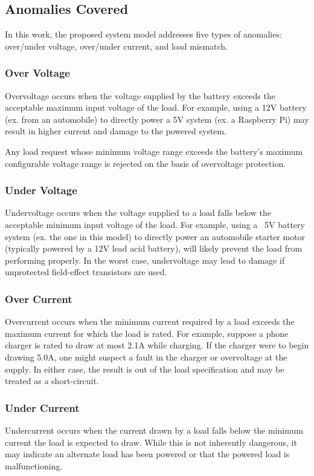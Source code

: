 \documentclass[11pt,conference,draftcls,onecolumn]{IEEEtran}
\begin{document}
\subsection{Anomalies Covered}
In this work, the proposed system model addresses five types of anomalies: over/under voltage, over/under current, and load mismatch.

\subsubsection{Over Voltage}
Overvoltage occurs when the voltage supplied by the battery exceeds the acceptable maximum input voltage of the load.
For example, using a 12V battery (ex. from an automobile) to directly power a 5V system (ex. a Raspberry Pi) may result in higher current and damage to the powered system.

Any load request whose minimum voltage range exceeds the battery's maximum configurable voltage range is rejected on the basis of overvoltage protection.

\subsubsection{Under Voltage}
Undervoltage occurs when the voltage supplied to a load falls below the acceptable minimum input voltage of the load.
For example, using a ~5V battery system (ex. the one in this model) to directly power an automobile starter motor (typically powered by a 12V lead acid battery), will likely prevent the load from performing properly.
In the worst case, undervoltage may lead to damage if unprotected field-effect transistors are used.

\subsubsection{Over Current}
Overcurrent occurs when the minimum current required by a load exceeds the maximum current for which the load is rated.
For example, suppose a phone charger is rated to draw at most 2.1A while charging.
If the charger were to begin drawing 5.0A, one might suspect a fault in the charger or overvoltage at the supply.
In either case, the result is out of the load specification and may be treated as a short-circuit.

\subsubsection{Under Current}
Undercurrent occurs when the current drawn by a load falls below the minimum current the load is expected to draw.
While this is not inherently dangerous, it may indicate an alternate load has been powered or that the powered load is malfunctioning.
\end{document}
